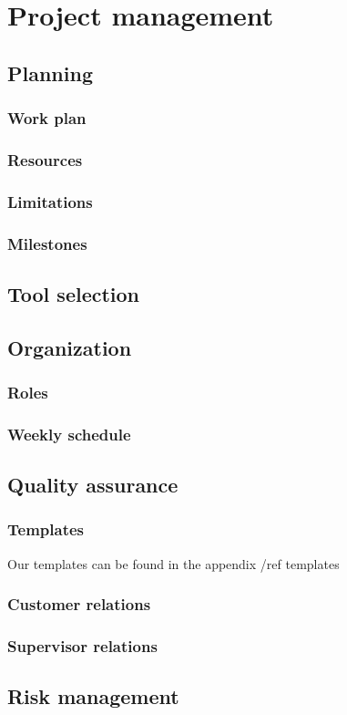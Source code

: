 \chapter{Project management}
\label{Project management} 

\section{Planning}

\subsection{Work plan}

\subsection{Resources}

\subsection{Limitations}

\subsection{Milestones}


\section{Tool selection}



\section{Organization}
\subsection{Roles}
\subsection{Weekly schedule}

\section{Quality assurance}
\subsection{Templates}

Our templates can be found in the appendix /ref templates
\subsection{Customer relations}
\subsection{Supervisor relations}


\section{Risk management}